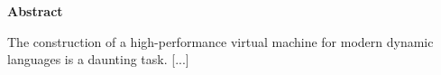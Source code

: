 \begin{center}
\textbf{\large Abstract}
\end{center}

The construction of a high-performance virtual machine for modern dynamic
languages is a daunting task. [...]


\vspace{1cm}

